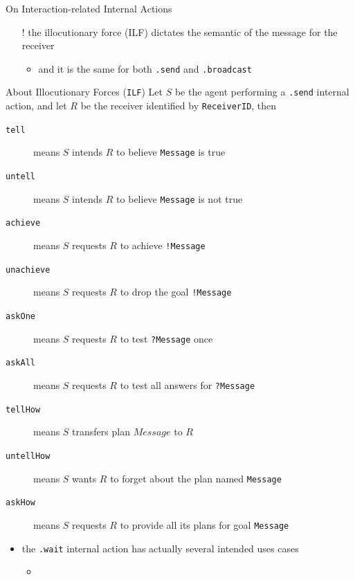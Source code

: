 \documentclass[presentation]{beamer}\mode<presentation>{\usetheme{AMSBolognaFC}}
\begin{document}
\begin{frame}[c,allowframebreaks]{On Interaction-related Internal Actions}
\vspace{.6cm}

\begin{itemize}
    \item[!] the illocutionary force (ILF) dictates the semantic of the message for the receiver
    \begin{itemize}
        \item and it is the same for both \texttt{.send} and \texttt{.broadcast}
    \end{itemize}
\end{itemize}

\framebreak

\begin{block}{About Illocutionary Forces (\texttt{ILF})}
    Let $S$ be the agent performing a \texttt{.send} internal action, and let $R$ be the receiver identified by \texttt{ReceiverID}, then
    \begin{description}
        \item[\texttt{tell}] means $S$ intends $R$ to believe \texttt{Message} is true
        \item[\texttt{untell}] means $S$ intends $R$ to believe \texttt{Message} is not true
        \item[\texttt{achieve}] means $S$ requests $R$ to achieve \texttt{!Message}
        \item[\texttt{unachieve}] means $S$ requests $R$ to drop the goal \texttt{!Message}
        \item[\texttt{askOne}] means $S$ requests $R$ to test \texttt{?Message} once
        \item[\texttt{askAll}] means $S$ requests $R$ to test all answers for \texttt{?Message}
        \item[\texttt{tellHow}] means $S$ transfers plan $Message$ to $R$
        \item[\texttt{untellHow}] means $S$ wants $R$ to forget about the plan named \texttt{Message}
        \item[\texttt{askHow}] means $S$ requests $R$ to provide all its plans for goal \texttt{Message}
    \end{description}
\end{block}


\framebreak

\begin{itemize}
    \item the \texttt{.wait} internal action has actually several intended uses cases
    \begin{itemize}
        \item {}
    \end{itemize}
\end{itemize}


\end{frame}
\end{document}
